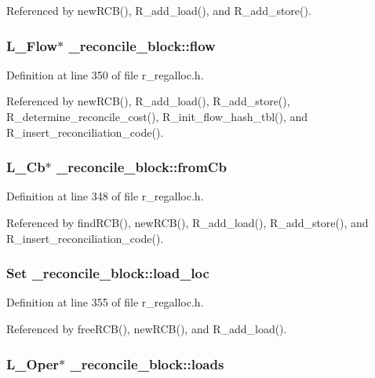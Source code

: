 Referenced by new\-RCB(), R\_\-add\_\-load(), and R\_\-add\_\-store().
\subsubsection{\setlength{\rightskip}{0pt plus 5cm}L\_\-Flow$\ast$ \bf{\_\-reconcile\_\-block::flow}}\label{struct__reconcile__block_6b693922dac244caf385486b18e16add}




Definition at line 350 of file r\_\-regalloc.h.

Referenced by new\-RCB(), R\_\-add\_\-load(), R\_\-add\_\-store(), R\_\-determine\_\-reconcile\_\-cost(), R\_\-init\_\-flow\_\-hash\_\-tbl(), and R\_\-insert\_\-reconciliation\_\-code().
\subsubsection{\setlength{\rightskip}{0pt plus 5cm}L\_\-Cb$\ast$ \bf{\_\-reconcile\_\-block::from\-Cb}}\label{struct__reconcile__block_65012473eecdefeea5a6fc13021a5252}




Definition at line 348 of file r\_\-regalloc.h.

Referenced by find\-RCB(), new\-RCB(), R\_\-add\_\-load(), R\_\-add\_\-store(), and R\_\-insert\_\-reconciliation\_\-code().
\subsubsection{\setlength{\rightskip}{0pt plus 5cm}\bf{Set} \bf{\_\-reconcile\_\-block::load\_\-loc}}\label{struct__reconcile__block_0b1370799cf7c2a6cd4f7bdbc81b9240}




Definition at line 355 of file r\_\-regalloc.h.

Referenced by free\-RCB(), new\-RCB(), and R\_\-add\_\-load().
\subsubsection{\setlength{\rightskip}{0pt plus 5cm}L\_\-Oper$\ast$ \bf{\_\-reconcile\_\-block::loads}}\label{struct__reconcile__block_967a73e35066afc1c765887c3added42}





